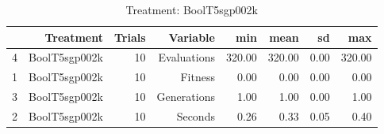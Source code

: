 \begin{table}[ht]
\centering
\begin{tabular}{rrrrrrrr}
  \hline
 & Treatment & Trials & Variable & min & mean & sd & max \\ 
  \hline
4 & BoolT5sgp002k &  10 & Evaluations & 320.00 & 320.00 & 0.00 & 320.00 \\ 
  1 & BoolT5sgp002k &  10 & Fitness & 0.00 & 0.00 & 0.00 & 0.00 \\ 
  3 & BoolT5sgp002k &  10 & Generations & 1.00 & 1.00 & 0.00 & 1.00 \\ 
  2 & BoolT5sgp002k &  10 & Seconds & 0.26 & 0.33 & 0.05 & 0.40 \\ 
   \hline
\end{tabular}
\caption{Treatment: BoolT5sgp002k} 
\end{table}
